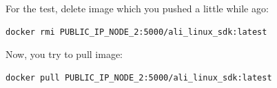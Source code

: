\documentclass[12pt]{report}
\begin{document}
For the test, delete image which you pushed a little while ago:
\begin{lstlisting}[caption= Delte image.]
	docker rmi PUBLIC_IP_NODE_2:5000/ali_linux_sdk:latest
\end{lstlisting}

Now, you try to pull image:
\begin{lstlisting}[caption= Pull image.]
	docker pull PUBLIC_IP_NODE_2:5000/ali_linux_sdk:latest
\end{lstlisting}
\end{document}
